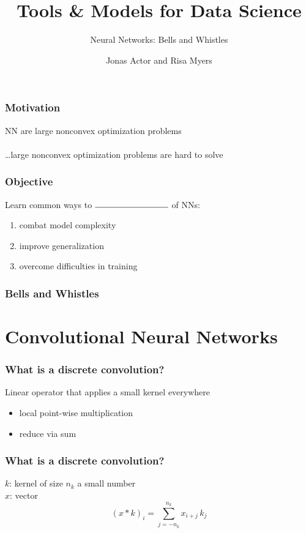 \documentclass[aspectratio=169,14pt]{beamer}
\title[]
{Tools \& Models for Data Science}
\subtitle{Neural Networks: Bells and Whistles}
\author[]{Jonas Actor and Risa Myers}
\institute
{  Rice University  }
\date[]{}
\begin{document}
\begin{frame}
 \titlepage
\end{frame}



\begin{frame}
    \frametitle{Motivation}

NN are large nonconvex optimization problems
~\\~\\
\quad \dots large nonconvex optimization problems are hard to solve

\end{frame}

\begin{frame}
\frametitle{Objective}
Learn common ways to $\rule{3cm}{0.15mm}$ of NNs:
\begin{enumerate}
\item combat model complexity
\item improve generalization
\item overcome difficulties in training
\end{enumerate}

\end{frame}




\begin{frame}
\frametitle{Bells and Whistles}
\tableofcontents
\end{frame}

\section{Convolutional Neural Networks}
\begin{frame}
\frametitle{What is a discrete convolution?}
 Linear operator that applies a small kernel everywhere
 \begin{itemize}
     \item local point-wise multiplication
     \item reduce via sum
 \end{itemize}
\end{frame}


\begin{frame}
    \frametitle{What is a discrete convolution?}
    $k$: kernel of size $n_k$ a small number \\
    $x$: vector ~\\
$$ (x * k)_i = \sum_{j=-n_k}^{n_k} x_{i+j} \, k_j $$
\end{frame}
\end{document}
